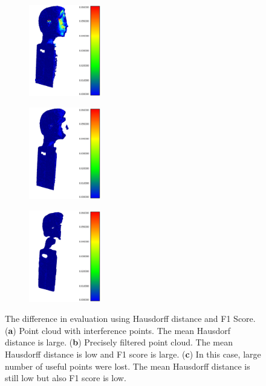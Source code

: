 \begin{figure}[h]
	\centering
	\begin{subfigure}[b]{0.32\textwidth}
		\centering
		\includegraphics[height=4cm]{figures/sorinterf.png}
		\caption{}
		\label{fig:sor_hausdorff:a}
	\end{subfigure}
	\hfill
	\begin{subfigure}[b]{0.32\textwidth}
		\centering
		\includegraphics[height=4cm]{figures/soridealfilt.png}
		\caption{}
		\label{fig:sor_hausdorff:b}
	\end{subfigure}
	\hfill
	\begin{subfigure}[b]{0.32\textwidth}
		\centering
		\includegraphics[height=4cm]{figures/soroverfilt.png}
		\caption{}
		\label{fig:sor_hausdorff:c}
	\end{subfigure}
	\caption{The difference in evaluation using Hausdorff distance and F1 Score. (\textbf{a}) Point cloud with interference points. The mean Hausdorf distance is large. (\textbf{b}) Precisely filtered point cloud. The mean Hausdorff distance is low and F1 score is large. (\textbf{c}) In this case, large number of useful points were lost. The mean Hausdorff distance is still low but also F1 score is low.}
	\label{fig:sor_hausdorff}
\end{figure}

